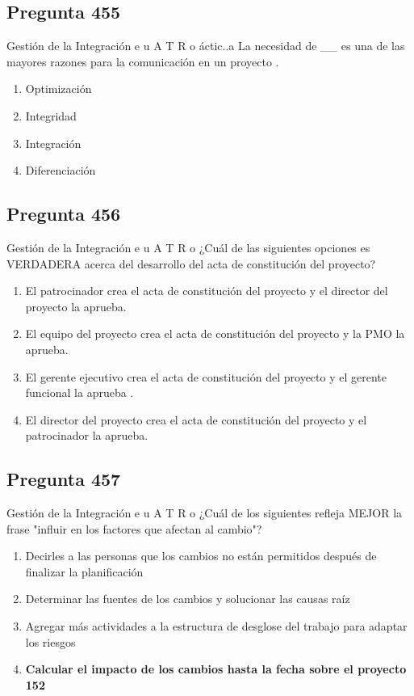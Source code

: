 \documentclass[11pt,a4paper]{article}
\begin{document}
\subsection*{Pregunta 455}
Gestión de la Integración e u A T R o áctic..a La necesidad de \_\_ es una de las mayores razones para la comunicación en un proyecto .

\begin{enumerate}[label=\alph*)]
  \item Optimización
  \item Integridad
  \item Integración
  \item Diferenciación
\end{enumerate}

\subsection*{Pregunta 456}
Gestión de la Integración e u A T R o ¿Cuál de las siguientes opciones es VERDADERA acerca del desarrollo del acta de constitución del proyecto?

\begin{enumerate}[label=\alph*)]
  \item El patrocinador crea el acta de constitución del proyecto y el director del proyecto la aprueba.
  \item El equipo del proyecto crea el acta de constitución del proyecto y la PMO la aprueba.
  \item El gerente ejecutivo crea el acta de constitución del proyecto y el gerente funcional la aprueba .
  \item El director del proyecto crea el acta de constitución del proyecto y el patrocinador la aprueba.
\end{enumerate}

\subsection*{Pregunta 457}
Gestión de la Integración e u A T R o ¿Cuál de los siguientes refleja MEJOR la frase "influir en los factores que afectan al cambio"?

\begin{enumerate}[label=\alph*)]
  \item Decirles a las personas que los cambios no están permitidos después de finalizar la planificación
  \item Determinar las fuentes de los cambios y solucionar las causas raíz
  \item Agregar más actividades a la estructura de desglose del trabajo para adaptar los riesgos
  \item \textbf{Calcular el impacto de los cambios hasta la fecha sobre el proyecto 152}
\end{enumerate}
\end{document}
